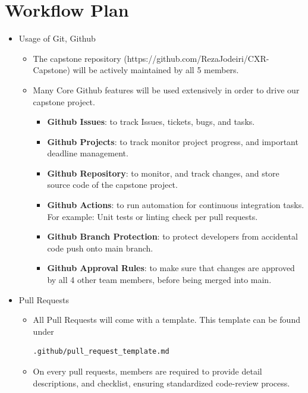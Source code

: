 \documentclass{article}
\begin{document}
\section{Workflow Plan}

\begin{itemize}

  \item Usage of Git, Github
  \begin{itemize}
    \item The capstone repository (https://github.com/RezaJodeiri/CXR-Capstone) will be actively maintained by all 5 members.
    \item Many Core Github features will be used extensively in order to drive our capstone project.
    \begin{itemize}
      \item \textbf{Github Issues}: to track Issues, tickets, bugs, and tasks.
      \item \textbf{Github Projects}: to track monitor project progress, and important deadline management.
      \item \textbf{Github Repository}: to monitor, and track changes, and store source code of the capstone project.
      \item \textbf{Github Actions}: to run automation for continuous integration tasks. For example: Unit tests or linting check per pull requests.
      \item \textbf{Github Branch Protection}: to protect developers from accidental code push onto main branch.
      \item \textbf{Github Approval Rules}: to make sure that changes are approved by all 4 other team members, before being merged into main.
    \end{itemize}
  \end{itemize}

  \item Pull Requests
  \begin{itemize}
    \item All Pull Requests will come with a template. This template can be found under \begin{verbatim}.github/pull_request_template.md \end{verbatim}
    \item On every pull requests, members are required to provide detail descriptions, and checklist, ensuring standardized code-review process.
  \end{itemize}
  

\end{itemize}
\end{document}
